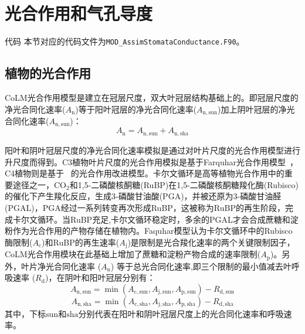 \chapter{光合作用和气孔导度}
\begin{mymdframed}{代码}
本节对应的代码文件为\texttt{MOD\_AssimStomataConductance.F90}。
\end{mymdframed}


\section{植物的光合作用}\label{植物的光合作用}
CoLM光合作用模型是建立在冠层尺度，双大叶冠层结构基础上的。即冠层尺度的净光合同化速率($A_{\mathrm{n}}$)等于阳叶冠层的净光合同化速率($A_{\mathrm{n,sun}}$)加上阴叶冠层的净光合同化速率($A_{\mathrm{n,sun}}$)：
\begin{equation}\label{Ansun_Ansha}
A_{\mathrm{n}}=A_{\mathrm{n,sun}}+A_{\mathrm{n,sha}}
\end{equation}

阳叶和阴叶冠层尺度的净光合同化速率模拟是通过对叶片尺度的光合作用模型进行升尺度而得到。C3植物叶片尺度的光合作用模拟是基于Farquhar光合作用模型~\citep{farquhar1980biochemical}，
C4植物则是基于~\citet{collatz1992} 的光合作用改进模型。卡尔文循环是高等植物光合作用中的重要途径之一，CO$_2$和1,5-二磷酸核酮糖(RuBP)在1,5-二磷酸核酮糖羧化酶(Rubisco)的催化下产生羧化反应，生成3-磷酸甘油酸(PGA)，并被还原为3-磷酸甘油醛(PGAL)，PGA经过一系列转变再次形成RuBP，这被称为RuBP的再生阶段，完成卡尔文循环。当RuBP充足,卡尔文循环稳定时，多余的PGAL才会合成蔗糖和淀粉作为光合作用的产物存储在植物内。Faquhar模型认为卡尔文循环中的Rubisco酶限制($A_{\mathrm{c}}$)和RuBP的再生速率($A_{\mathrm{j}}$)是限制是光合羧化速率的两个关键限制因子，CoLM光合作用模块在此基础上增加了蔗糖和淀粉产物合成的速率限制($A_{\mathrm{p}}$)。另外，叶片净光合同化速率 ($A_{\mathrm{n}}$) 等于总光合同化速率,即三个限制的最小值减去叶呼吸速率 ($R_{\mathrm {d}}$)，在阴叶和阳叶冠层分别有：
\begin{equation}\label{An1sun}
A_{\mathrm{n,sun}}=\min \left(A_{\mathrm{c,sun}}, A_{\mathrm{j,sun}}, A_{\mathrm{p,sun}}\right)-R_{\mathrm{d,sun}}
\end{equation}
\begin{equation}\label{An1sha}
A_{\mathrm{n,sha}}=\min \left(A_{\mathrm{c,sha}}, A_{\mathrm{j,sha}}, A_{\mathrm{p,sha}}\right)-R_{\mathrm{d,sha}}
\end{equation}
其中，下标${\mathrm {sun}}$和${\mathrm {sha}}$分别代表在阳叶和阴叶冠层尺度上的光合同化速率和呼吸速率。


